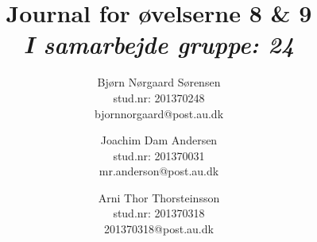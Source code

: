 

	\chead{\myTitle}	\rhead{\today}
\lfoot{}		\cfoot{}			\rfoot{\thepage}
\renewcommand{\headrulewidth}{1pt}
\renewcommand{\footrulewidth}{0pt}

\newcommand{\myTitle}{\textbf{Journal for øvelserne 8 \& 9}}
\newcommand{\mySubTitle}{\textit{I samarbejde gruppe: 24}}
\title{\myTitle \\ \mySubTitle}
\author{
	Bjørn Nørgaard Sørensen\\
	stud.nr: 201370248\\
	bjornnorgaard@post.au.dk
	\and
	Joachim Dam Andersen\\
	stud.nr: 201370031\\
	mr.anderson@post.au.dk
	\and
	Arni Thor Thorsteinsson\\
	stud.nr: 201370318\\
	201370318@post.au.dk
}


	\maketitle
	\newpage
	
	
	\newpage
	
	\newpage
	
	\newpage
	

